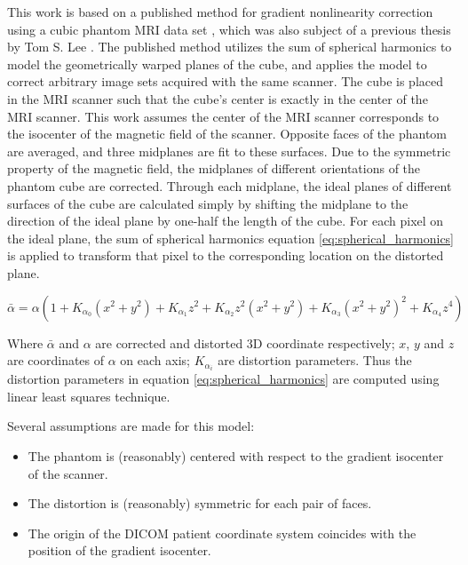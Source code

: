 This work is based on a published method for gradient nonlinearity correction using a cubic phantom MRI data set \cite{simple_approach}, which was also subject of a previous thesis by Tom S. Lee \cite{tom_thesis}.
The published method utilizes the sum of spherical
harmonics to model the geometrically warped planes of the cube, and applies the model
to correct arbitrary image sets acquired with the same scanner. The cube is
placed in the MRI scanner such that the cube's center is exactly in the center of the MRI scanner.  This work assumes the center of the MRI scanner corresponds to the isocenter of the
magnetic field of the scanner. Opposite faces of the phantom are averaged, and three midplanes are fit to these surfaces.  Due to the symmetric property of the magnetic field,
the midplanes of different orientations of the phantom cube are corrected.  Through each midplane, the ideal planes of different surfaces
of the cube are calculated simply by shifting the midplane to the direction
of the ideal plane by one-half the length of the cube. For each pixel on
the ideal plane, the sum of spherical
harmonics equation \ref{eq:spherical_harmonics} is applied to transform that pixel to the corresponding location on the distorted plane.

\begin{equation} \label{eq:spherical_harmonics}
\bar{\alpha} = \alpha(1 + K_{\alpha_0}(x^2 + y^2) + K_{\alpha_1}z^2 +
K_{\alpha_2}z^2(x^2 + y^2) + K_{\alpha_3}(x^2 + y^2)^2 +
K_{\alpha_4}z^4)
\end{equation}

Where $\bar{\alpha}$ and $\alpha$ are corrected and distorted 3D coordinate respectively; $x$, $y$ and $z$ are coordinates of $\alpha$ on each axis; $K_{\alpha_i}$ are distortion parameters. Thus the distortion parameters in
equation \ref{eq:spherical_harmonics} are computed using linear least squares
technique.

Several assumptions are made for this model:
\begin{itemize}
  \item The phantom is (reasonably) centered with respect to the gradient isocenter of the scanner.
  \item The distortion is (reasonably) symmetric for each pair of faces.
  \item The origin of the DICOM patient coordinate system coincides with the position of the gradient
    isocenter.
\end{itemize}



